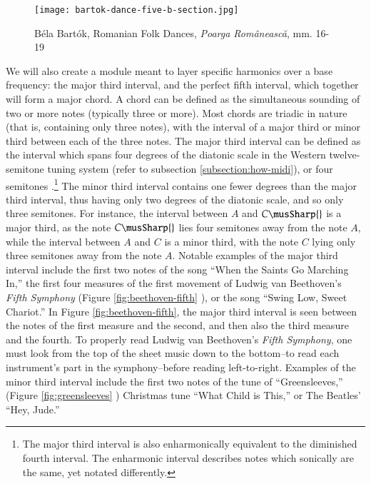 \begin{figure}[h]
  \centering
  \texttt{[image: bartok-dance-five-b-section.jpg]}
  \caption{Béla Bartók, Romanian Folk Dances, \textit{Poarga Românească}, mm. 16-19}
  \label{fig:bartok-dance-five-b-section}
\end{figure}

We will also create a module meant to layer specific harmonics over a base frequency: the major third interval, and the perfect fifth interval, which together will form a major chord. A chord can be defined as the simultaneous sounding of two or more notes (typically three or more). Most chords are triadic in nature (that is, containing only three notes), with the interval of a major third or minor third between each of the three notes. The major third interval can be defined as the interval which spans four degrees of the diatonic scale in the Western twelve-semitone tuning system (refer to subsection \ref{subsection:how-midi}), or four semitones \cite{Nave_2017}.\footnote{The major third interval is also enharmonically equivalent to the diminished fourth interval. The enharmonic interval describes notes which sonically are the same, yet notated differently.} The minor third interval contains one fewer degrees than the major third interval, thus having only two degrees of the diatonic scale, and so only three semitones. For instance, the interval between $A$ and $C\musSharp{}$ is a major third, as the note $C\musSharp{}$ lies four semitones away from the note $A$, while the interval between $A$ and $C$ is a minor third, with the note $C$ lying only three semitones away from the note $A$. Notable examples of the major third interval include the first two notes of the song ``When the Saints Go Marching In,'' the first four measures of the first movement of Ludwig van Beethoven's \textit{Fifth Symphony} (Figure \ref{fig:beethoven-fifth} \cite{Beethoven_1862}), or the song ``Swing Low, Sweet Chariot.'' In Figure \ref{fig:beethoven-fifth}, the major third interval is seen between the notes of the first measure and the second, and then also the third measure and the fourth. To properly read Ludwig van Beethoven's \textit{Fifth Symphony}, one must look from the top of the sheet music down to the bottom--to read each instrument's part in the symphony--before reading left-to-right. Examples of the minor third interval include the first two notes of the tune of ``Greensleeves,'' (Figure \ref{fig:greensleeves} \cite{Kurtz_2010}) Christmas tune ``What Child is This,'' or The Beatles' ``Hey, Jude.''

